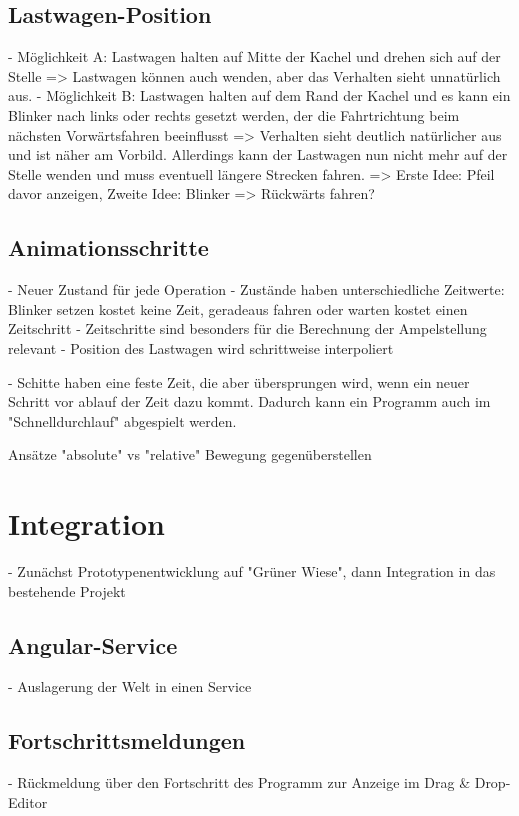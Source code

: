 \subsection{Lastwagen-Position}

- Möglichkeit A: Lastwagen halten auf Mitte der Kachel und drehen sich auf der
                 Stelle => Lastwagen können auch wenden, aber das Verhalten
                 sieht unnatürlich aus.
- Möglichkeit B: Lastwagen halten auf dem Rand der Kachel und es kann ein
                 Blinker nach links oder rechts gesetzt werden, der die
                 Fahrtrichtung beim nächsten Vorwärtsfahren beeinflusst
                 => Verhalten sieht deutlich natürlicher aus und ist näher am
                 Vorbild. Allerdings kann der Lastwagen nun nicht mehr auf der
                 Stelle wenden und muss eventuell längere Strecken fahren.
                 => Erste Idee: Pfeil davor anzeigen, Zweite Idee: Blinker
                 => Rückwärts fahren?

\subsection{Animationsschritte}

- Neuer Zustand für jede Operation
- Zustände haben unterschiedliche Zeitwerte: Blinker setzen kostet keine Zeit,
  geradeaus fahren oder warten kostet einen Zeitschritt
- Zeitschritte sind besonders für die Berechnung der Ampelstellung relevant
- Position des Lastwagen wird schrittweise interpoliert

- Schitte haben eine feste Zeit, die aber übersprungen wird, wenn ein neuer
  Schritt vor ablauf der Zeit dazu kommt. Dadurch kann ein Programm auch im
  "Schnelldurchlauf" abgespielt werden.

Ansätze "absolute" vs "relative" Bewegung gegenüberstellen

\section{Integration}

- Zunächst Prototypenentwicklung auf "Grüner Wiese", dann Integration in das
  bestehende Projekt

\subsection{Angular-Service}

- Auslagerung der Welt in einen Service

\subsection{Fortschrittsmeldungen}

- Rückmeldung über den Fortschritt des Programm zur Anzeige im Drag \& Drop-Editor
